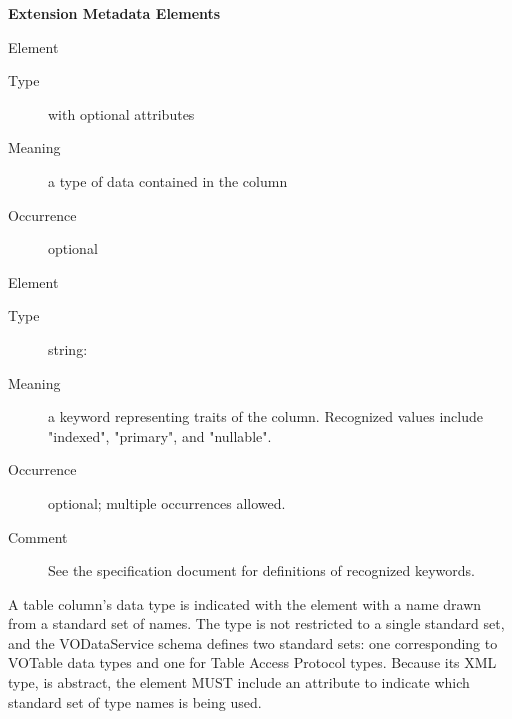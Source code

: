 \documentclass[11pt,a4paper]{ivoa}
\begin{document}
\begin{generated}
\vspace{0.5ex}\noindent\textbf{ Extension Metadata Elements}

\begingroup\small\begin{bigdescription}\item[Element \xmlel{dataType}]
\begin{description}
\item[Type]  with optional attributes
\item[Meaning] 
                        a type of data contained in the column
                     
\item[Occurrence] optional

\end{description}
\item[Element \xmlel{flag}]
\begin{description}
\item[Type] string: 
\item[Meaning] 
                        a keyword representing traits of the column.  
                        Recognized values include {"}indexed{"}, {"}primary{"}, and
                        {"}nullable{"}.  
                     
\item[Occurrence] optional; multiple occurrences allowed.
\item[Comment] 
                        See the specification document for definitions 
                        of recognized keywords.
                     

\end{description}


\end{bigdescription}\endgroup

\endgroup
\end{generated}



A table column's data type is indicated with the 
element with a name drawn from a standard set of names.  The
 type is not restricted to a single standard
set, and the VODataService schema defines two standard sets: one
corresponding to VOTable data types \citep{2013ivoa.spec.0920O}
and one for Table Access Protocol types.  Because
its XML type,  is abstract, the
 element MUST include an
 attribute to indicate which standard set of type
names is being used.  
\end{document}
